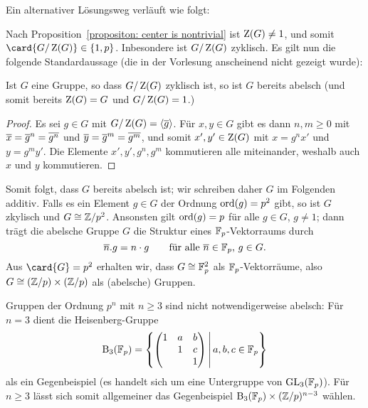 \begin{remark}
  Ein alternativer Lösungsweg verläuft wie folgt:
  
  Nach Proposition~\ref{propositon: center is nontrivial} ist $\operatorname{Z}(G) \neq 1$, und somit $\card{ G / \groupcenter{G} } \in \{1, p\}$.
  Inbesondere ist $G / \operatorname{Z}(G)$ zyklisch.
  Es gilt nun die folgende Standardaussage (die in der Vorlesung anscheinend nicht gezeigt wurde):
  
  \begin{lemma}
    Ist $G$ eine Gruppe, so dass $G/\operatorname{Z}(G)$ zyklisch ist, so ist $G$ bereits abelsch \textup(und somit bereits $\operatorname{Z}(G) = G$ und $G/\operatorname{Z}(G) = 1$.\textup)
  \end{lemma}
  
  \begin{proof}
    Es sei $g \in G$ mit $G/\operatorname{Z}(G) = \langle \overline{g} \rangle$.
    Für $x, y \in G$ gibt es dann $n, m \geq 0$ mit $\overline{x} = \overline{g}^n = \overline{g^n}$ und $\overline{y} = \overline{g}^m = \overline{g^m}$, und somit $x', y' \in \operatorname{Z}(G)$ mit $x = g^n x'$ und $y = g^m y'$.
    Die Elemente $x', y', g^n, g^m$ kommutieren alle miteinander, weshalb auch $x$ und $y$ kommutieren.
  \end{proof}
  
  Somit folgt, dass $G$ bereits abelsch ist;
  wir schreiben daher $G$ im Folgenden additiv.
  Falls es ein Element $g \in G$ der Ordnung $\operatorname{ord}(g) = p^2$ gibt, so ist $G$ zkylisch und $G \cong \mathbb{Z}/p^2$.
  Ansonsten gilt $\operatorname{ord}(g) = p$ für alle $g \in G$, $g \neq 1$;
  dann trägt die abelsche Gruppe $G$ die Struktur eines $\mathbb{F}_{p}$-Vektorraums durch
  \[
      \overline{n}.g
    = n \cdot g
    \qquad
    \text{für alle $\overline{n} \in \mathbb{F}_{p}$, $g \in G$}.
  \]
  Aus $\card{G} = p^2$ erhalten wir, dass $G \cong \mathbb{F}_{p}^2$ als $\mathbb{F}_{p}$-Vektorräume, also $G \cong (\mathbb{Z}/p) \times (\mathbb{Z}/p)$ als (abelsche) Gruppen.
\end{remark}

\begin{remark}
  Gruppen der Ordnung $p^n$ mit $n \geq 3$ sind nicht notwendigerweise abelsch:
  Für $n = 3$ dient die Heisenberg-Gruppe
  \[
      \Borel{3}{\Finite{p}}
    = \left\{
        \begin{pmatrix}
          1 & a & b \\
            & 1 & c \\
            &   & 1
        \end{pmatrix}
        \suchthat*
        a, b, c \in \Finite{p}
      \right\}
  \]
  als ein Gegenbeispiel (es handelt sich um eine Untergruppe von $\operatorname{GL}_{3}(\mathbb{F}_{p})$).
  Für $n \geq 3$ lässt sich somit allgemeiner das Gegenbeispiel $\operatorname{B}_{3}(\mathbb{F}_{p}) \times (\mathbb{Z}/p)^{n-3}$ wählen.
\end{remark}

